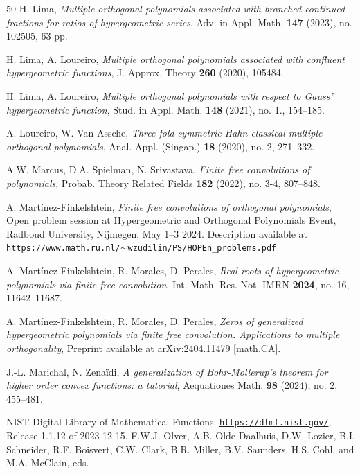 \documentclass[a4paper,12pt,oneside]{article}
\theoremstyle{definition}
\begin{document}
\begin{thebibliography}{50}
H. Lima, 
\textit{Multiple orthogonal polynomials associated with branched continued fractions for ratios of hypergeometric series}, 
Adv. in Appl. Math. \textbf{147} (2023), no. 102505, 63 pp.

 H. Lima, A. Loureiro,
\textit{Multiple orthogonal polynomials associated with confluent hypergeometric functions},
J. Approx. Theory \textbf{260} (2020), 105484.

 H. Lima, A. Loureiro,
\textit{Multiple orthogonal polynomials with respect to Gauss' hypergeometric function}, 
Stud. in Appl. Math. \textbf{148} (2021), no. 1., 154--185.

A. Loureiro, W. Van Assche,
\textit{Three-fold symmetric Hahn-classical multiple orthogonal polynomials}, 
Anal. Appl. (Singap.) \textbf{18} (2020), no. 2, 271--332.

 A.W. Marcus, D.A. Spielman, N. Srivastava, 
\textit{Finite free convolutions of polynomials}, 
Probab. Theory Related Fields \textbf{182} (2022), no. 3-4, 807--848.

A. Martínez-Finkelshtein,
\textit{Finite free convolutions of orthogonal polynomials},
Open problem session at Hypergeometric and Orthogonal Polynomials Event,
Radboud University, Nijmegen, May 1--3 2024. Description available at \href{https://www.math.ru.nl/~wzudilin/PS/HOPEn_problems.pdf}{\texttt{https://www.math.ru.nl/$\sim$wzudilin/PS/HOPEn_problems.pdf}}

A. Martínez-Finkelshtein, R. Morales, D. Perales, 
\textit{Real roots of hypergeometric polynomials via finite free convolution}, 
Int. Math. Res. Not. IMRN \textbf{2024}, no. 16, 11642–11687.

A. Martínez-Finkelshtein, R. Morales, D. Perales, 
\textit{Zeros of generalized hypergeometric polynomials via finite free convolution. Applications to multiple orthogonality}, 
Preprint available at arXiv:2404.11479 [math.CA].

J.-L. Marichal, N. Zenaïdi, 
\textit{A generalization of Bohr-Mollerup's theorem for higher order convex functions: a tutorial}, Aequationes Math. \textbf{98} (2024), no. 2, 455--481.

 NIST Digital Library of Mathematical Functions. \href{https://dlmf.nist.gov/}{\texttt{https://dlmf.nist.gov/}}, Release 1.1.12 of 2023-12-15. F.W.J. Olver, A.B. Olde Daalhuis, D.W. Lozier, B.I. Schneider, R.F. Boisvert, C.W. Clark, B.R. Miller, B.V. Saunders, H.S. Cohl, and M.A. McClain, eds.


\end{thebibliography}
\end{document}

